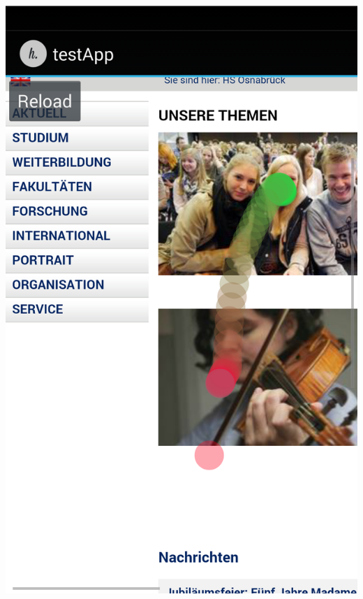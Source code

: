 \begin{minipage}[t]{0.45\textwidth}
\centering
	\includegraphics[width = \linewidth]{img/android/testapp_web}
	\label{fig:testapp_web}
\end{minipage}
\hfill
